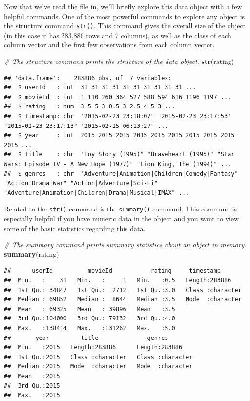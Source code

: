 \documentclass[]{book}
\newenvironment{Shaded}{\begin{snugshade}}{\end{snugshade}}
\newcommand{\KeywordTok}[1]{\textcolor[rgb]{0.13,0.29,0.53}{\textbf{{#1}}}}
\newcommand{\CommentTok}[1]{\textcolor[rgb]{0.56,0.35,0.01}{\textit{{#1}}}}
\newcommand{\NormalTok}[1]{{#1}}
\begin{document}
Now that we've read the file in, we'll briefly explore this data object
with a few helpful commands. One of the most powerful commands to
explore any object is the structure command \texttt{str()}. This command
gives the overall size of the object (in this case it has 283,886 rows
and 7 columns), as well as the class of each column vector and the first
few observations from each column vector.

\begin{Shaded}
\begin{Highlighting}[]
\CommentTok{# The structure command prints the structure of the data object.}
\KeywordTok{str}\NormalTok{(rating)}
\end{Highlighting}
\end{Shaded}

\begin{verbatim}
## 'data.frame':    283886 obs. of  7 variables:
##  $ userId   : int  31 31 31 31 31 31 31 31 31 31 ...
##  $ movieId  : int  1 110 260 364 527 588 594 616 1196 1197 ...
##  $ rating   : num  3 5 5 3 0.5 3 2.5 4 5 3 ...
##  $ timestamp: chr  "2015-02-23 23:18:07" "2015-02-23 23:17:53" "2015-02-23 23:17:13" "2015-02-25 06:13:27" ...
##  $ year     : int  2015 2015 2015 2015 2015 2015 2015 2015 2015 2015 ...
##  $ title    : chr  "Toy Story (1995)" "Braveheart (1995)" "Star Wars: Episode IV - A New Hope (1977)" "Lion King, The (1994)" ...
##  $ genres   : chr  "Adventure|Animation|Children|Comedy|Fantasy" "Action|Drama|War" "Action|Adventure|Sci-Fi" "Adventure|Animation|Children|Drama|Musical|IMAX" ...
\end{verbatim}

Related to the \texttt{str()} command is the \texttt{summary()} command.
This command is especially helpful if you have numeric data in the
object and you want to view some of the basic statistics regarding this
data.

\begin{Shaded}
\begin{Highlighting}[]
\CommentTok{# The summary command prints summary statistics about an object in memory.}
\KeywordTok{summary}\NormalTok{(rating)}
\end{Highlighting}
\end{Shaded}

\begin{verbatim}
##      userId          movieId           rating     timestamp        
##  Min.   :    31   Min.   :     1   Min.   :0.5   Length:283886     
##  1st Qu.: 34847   1st Qu.:  2712   1st Qu.:3.0   Class :character  
##  Median : 69852   Median :  8644   Median :3.5   Mode  :character  
##  Mean   : 69325   Mean   : 39896   Mean   :3.5                     
##  3rd Qu.:104000   3rd Qu.: 79132   3rd Qu.:4.0                     
##  Max.   :138414   Max.   :131262   Max.   :5.0                     
##       year         title              genres         
##  Min.   :2015   Length:283886      Length:283886     
##  1st Qu.:2015   Class :character   Class :character  
##  Median :2015   Mode  :character   Mode  :character  
##  Mean   :2015                                        
##  3rd Qu.:2015                                        
##  Max.   :2015
\end{verbatim}
\end{document}
